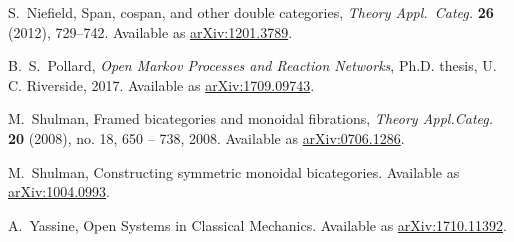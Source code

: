 \documentclass[reqno]{amsart}
\begin{document}
\begin{thebibliography}{100}
 S.~Niefield, Span, cospan, and other double categories, \textsl{Theory Appl.\ Categ.} \textbf{26} (2012), 729--742. Available as \href{https://arxiv.org/abs/1201.3789}{arXiv:1201.3789}.


 B.\ S.\ Pollard, \textsl{Open Markov Processes and Reaction Networks}, Ph.D. thesis, U. C. Riverside, 2017.  Available as \href{https://arxiv.org/abs/1709.09743}{arXiv:1709.09743}.



 M.\ Shulman, Framed bicategories and monoidal fibrations, \emph{Theory Appl.Categ.} \textbf{20} (2008), no. 18, 650 -- 738, 2008. Available as \href{https://arxiv.org/abs/0706.1286}{arXiv:0706.1286}.

 M.\ Shulman, Constructing symmetric monoidal bicategories. Available as \href{http://arxiv.org/abs/1004.0993}{arXiv:1004.0993}.


 A.\ Yassine, Open Systems in Classical Mechanics. Available as \href{https://arxiv.org/abs/1710.11392}{arXiv:1710.11392}.

\end{thebibliography}
\end{document}
